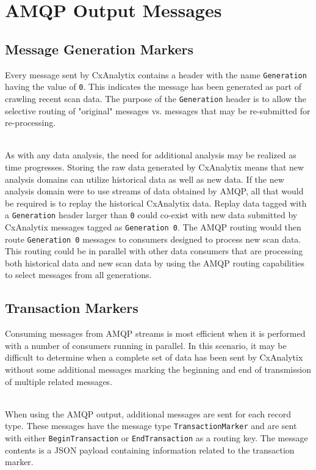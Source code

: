\section{AMQP Output Messages}

\subsection{Message Generation Markers}

Every message sent by CxAnalytix contains a header with the name \texttt{Generation} having the value of \texttt{0}.  This indicates the message
has been generated as part of crawling recent scan data. The purpose of the \texttt{Generation} header is to allow the selective routing of 
"original" messages vs. messages that may be re-submitted for re-processing. 

\noindent\\As with any data analysis, the need for additional analysis may be realized as time progresses.  Storing the raw data generated by
CxAnalytix means that new analysis domains can utilize historical data as well as new data.  If the new analysis domain were to use streams
of data obtained by AMQP, all that would be required is to replay the historical CxAnalytix data.  Replay data tagged with a \texttt{Generation}
header larger than \texttt{0} could co-exist with new data submitted by CxAnalytix messages tagged as \texttt{Generation 0}.  The AMQP routing
would then route \texttt{Generation 0} messages to consumers designed to process new scan data.  This routing could be in parallel with other 
data consumers that are processing both historical data and new scan data by using the AMQP routing capabilities to select messages
from all generations.

\subsection{Transaction Markers}

Consuming messages from AMQP streams is most efficient when it is performed with a number of consumers running in parallel.  In this scenario,
it may be difficult to determine when a complete set of data has been sent by CxAnalytix without some additional messages marking the beginning
and end of transmission of multiple related messages.

\noindent\\When using the AMQP output, additional messages are sent for each record type.  These messages have the message type \texttt{TransactionMarker}
and are sent with either \texttt{BeginTransaction} or \texttt{EndTransaction} as a routing key.  The message contents is a JSON payload containing
information related to the transaction marker.

